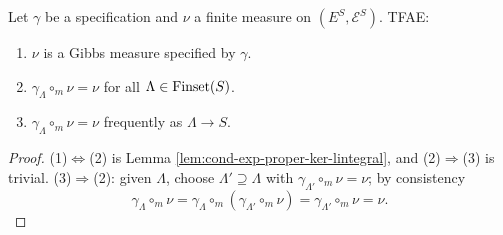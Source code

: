 \begin{lemma}
    \label{lem:gibbs-meas-tfae}
    \leanok

    Let $\gamma$ be a specification and $\nu$ a finite measure on $(E^S, \mathcal{E}^S)$. TFAE:
    \begin{enumerate}
        \item $\nu$ is a Gibbs measure specified by $\gamma$.
        \item $\gamma_\Lambda\circ_m\nu = \nu$ for all $\Lambda\in\operatorname{Finset}(S)$.
        \item $\gamma_\Lambda\circ_m\nu = \nu$ frequently as $\Lambda \to S$.
    \end{enumerate}
\end{lemma}
\begin{proof}
    \leanok

    (1)$\Leftrightarrow$(2) is Lemma \ref{lem:cond-exp-proper-ker-lintegral}, and
    (2)$\Rightarrow$(3) is trivial. (3)$\Rightarrow$(2): given $\Lambda$, choose
    $\Lambda' \supseteq \Lambda$ with $\gamma_{\Lambda'}\circ_m\nu = \nu$; by consistency
    \[\gamma_\Lambda\circ_m\nu = \gamma_\Lambda\circ_m(\gamma_{\Lambda'}\circ_m\nu)
      = \gamma_{\Lambda'}\circ_m\nu = \nu.\]
\end{proof}
